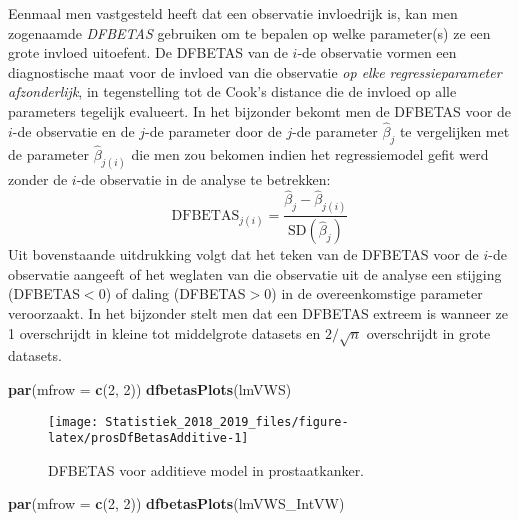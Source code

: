 \documentclass[12pt,dutch,coursenotes]{book}
\newenvironment{Shaded}{\begin{snugshade}}{\end{snugshade}}
\newcommand{\KeywordTok}[1]{\textcolor[rgb]{0.13,0.29,0.53}{\textbf{#1}}}
\newcommand{\DataTypeTok}[1]{\textcolor[rgb]{0.13,0.29,0.53}{#1}}
\newcommand{\DecValTok}[1]{\textcolor[rgb]{0.00,0.00,0.81}{#1}}
\newcommand{\NormalTok}[1]{#1}
\theoremstyle{definition}
\theoremstyle{definition}
\theoremstyle{definition}
\theoremstyle{remark}
\begin{document}
Eenmaal men vastgesteld heeft dat een observatie invloedrijk is, kan men
zogenaamde \emph{DFBETAS} gebruiken om te bepalen op welke parameter(s)
ze een grote invloed uitoefent. De DFBETAS van de \(i\)-de observatie
vormen een diagnostische maat voor de invloed van die observatie
\emph{op elke regressieparameter afzonderlijk}, in tegenstelling tot de
Cook's distance die de invloed op alle parameters tegelijk evalueert. In
het bijzonder bekomt men de DFBETAS voor de \(i\)-de observatie en de
\(j\)-de parameter door de \(j\)-de parameter \(\hat{\beta}_j\) te
vergelijken met de parameter \(\hat{\beta}_{j(i)}\) die men zou bekomen
indien het regressiemodel gefit werd zonder de \(i\)-de observatie in de
analyse te betrekken:
\[\textrm{DFBETAS}_{j(i)}=\frac{\hat{\beta}_{j}-\hat{\beta}_{j(i)}}{\textrm{SD}(\hat{\beta}_{j})}\]
Uit bovenstaande uitdrukking volgt dat het teken van de DFBETAS voor de
\(i\)-de observatie aangeeft of het weglaten van die observatie uit de
analyse een stijging (DFBETAS\(<0\)) of daling (DFBETAS\(>0\)) in de
overeenkomstige parameter veroorzaakt. In het bijzonder stelt men dat
een DFBETAS extreem is wanneer ze 1 overschrijdt in kleine tot
middelgrote datasets en \(2/\sqrt{n}\) overschrijdt in grote datasets.

\begin{Shaded}
\begin{Highlighting}[]
\KeywordTok{par}\NormalTok{(}\DataTypeTok{mfrow =} \KeywordTok{c}\NormalTok{(}\DecValTok{2}\NormalTok{, }\DecValTok{2}\NormalTok{))}
\KeywordTok{dfbetasPlots}\NormalTok{(lmVWS)}
\end{Highlighting}
\end{Shaded}

\begin{figure}

{\centering \texttt{[image: Statistiek\_2018\_2019\_files/figure-latex/prosDfBetasAdditive-1]} 

}

\caption{DFBETAS voor additieve model in prostaatkanker.}\label{fig:prosDfBetasAdditive}
\end{figure}

\begin{Shaded}
\begin{Highlighting}[]
\KeywordTok{par}\NormalTok{(}\DataTypeTok{mfrow =} \KeywordTok{c}\NormalTok{(}\DecValTok{2}\NormalTok{, }\DecValTok{2}\NormalTok{))}
\KeywordTok{dfbetasPlots}\NormalTok{(lmVWS_IntVW)}
\end{Highlighting}
\end{Shaded}
\end{document}
